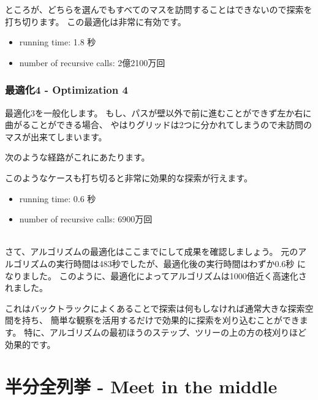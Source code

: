 ところが、どちらを選んでもすべてのマスを訪問することはできないので探索を打ち切ります。
この最適化は非常に有効です。
\begin{itemize}
\item
running time: 1.8 秒
\item
number of recursive calls: 2億2100万回
\end{itemize}

\subsubsection{最適化4 - Optimization 4}

最適化3を一般化します。
もし、パスが壁以外で前に進むことができず左か右に曲がることができる場合、
やはりグリッドは2つに分かれてしまうので未訪問のマスが出来てしまいます。

次のような経路がこれにあたります。
\begin{center}
\end{center}

このようなケースも打ち切ると非常に効果的な探索が行えます。
\begin{itemize}
\item
running time: 0.6 秒
\item
number of recursive calls: 6900万回
\end{itemize}

~\\
さて、アルゴリズムの最適化はここまでにして成果を確認しましょう。
元のアルゴリズムの実行時間は483秒でしたが、最適化後の実行時間はわずか0.6秒 になりました。
このように、最適化によってアルゴリズムは1000倍近く高速化されました。

これはバックトラックによくあることで探索は何もしなければ通常大きな探索空間を持ち、
簡単な観察を活用するだけで効果的に探索を刈り込むことができます。
特に、アルゴリズムの最初ほうのステップ、ツリーの上の方の枝刈りほど効果的です。

\section{半分全列挙 - Meet in the middle}

